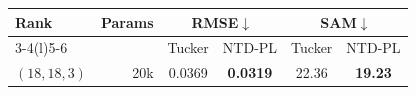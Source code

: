 \begin{tabular}{@{}l r cc cc@{}}
\toprule
Rank & Params & \multicolumn{2}{c}{RMSE$\downarrow$} & \multicolumn{2}{c}{SAM$\downarrow$} \\
\cmidrule(lr){3-4}\cmidrule(l){5-6}
 & & Tucker & NTD-PL & Tucker & NTD-PL \\
\midrule
$(18,18,3)$ & 20k & 0.0369 & \textbf{0.0319} & 22.36 & \textbf{19.23} \\
\bottomrule
\end{tabular}
